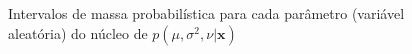 \begin{figure}[htb]
	\caption{Intervalos de massa probabilística para cada parâmetro (variável aleatória) do núcleo de $p(\mu, \sigma^2, \nu | \bm{x})$}%
\end{figure}

\newpage